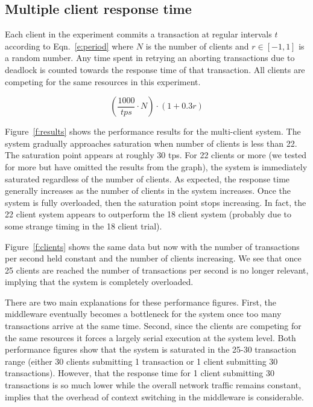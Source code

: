 \documentclass{article}
\begin{document}
\subsection{Multiple client response time}

Each client in the experiment commits a transaction at regular intervals $t$ according to Eqn.~\ref{e:period} where $N$ is the number of clients and $r \in [-1,1]$ is a random number. Any time spent in retrying an aborting transactions due to deadlock is counted towards the response time of that transaction. All clients are competing for the same resources in this experiment. 

\begin{equation}
\left(\frac{1000}{tps}\cdot N\right) \cdot(1 + 0.3r)
\label{e:period}
\end{equation}

Figure~\ref{f:results} shows the performance results for the multi-client system. The system gradually approaches saturation when number of clients is less than 22. The saturation point appears at roughly 30 tps. For 22 clients or more (we tested for more but have omitted the results from the graph), the system is immediately saturated regardless of the number of clients. As expected, the response time generally increases as the number of clients in the system increases. Once the system is fully overloaded, then the saturation point stops increasing. In fact, the 22 client system appears to outperform the 18 client system (probably due to some strange timing in the 18 client trial).

Figure~\ref{f:clients} shows the same data but now with the number of transactions per second held constant and the number of clients increasing. We see that once 25 clients are reached the number of transactions per second is no longer relevant, implying that the system is completely overloaded. 

There are two main explanations for these performance figures. First, the middleware eventually becomes a bottleneck for the system once too many transactions arrive at the same time. Second, since the clients are competing for the same resources it forces a largely serial execution at the system level. Both performance figures show that the system is saturated in the 25-30 transaction range (either 30 clients submitting 1 transaction or 1 client submitting 30 transactions). However, that the response time for 1 client submitting 30 transactions is so much lower while the overall network traffic remains constant, implies that the overhead of context switching in the middleware is considerable.
\end{document}
